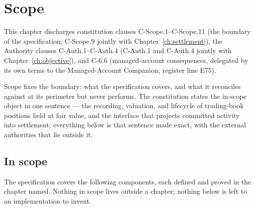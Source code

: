 \section{Scope}\label{ch:scope}

This chapter discharges constitution clauses C-Scope.1--C-Scope.11 (the boundary of the specification; C-Scope.9 jointly with Chapter~\ref{ch:settlement}), the Authority clauses C-Auth.1--C-Auth.4 (C-Auth.1 and C-Auth.4 jointly with Chapter~\ref{ch:objective}), and C-6.6 (managed-account consequences, delegated by its own terms to the Managed-Account Companion, register line E75).

Scope fixes the boundary: what the specification covers, and what it reconciles against
at its perimeter but never performs. The constitution states the in-scope object in one
sentence --- the recording, valuation, and lifecycle of trading-book positions held at
fair value, and the interface that projects committed activity into settlement; everything
below is that sentence made exact, with the external authorities that lie outside it.

\subsection{In scope}

The specification covers the following components, each defined and proved in the chapter
named. Nothing in scope lives outside a chapter; nothing below is left to an implementation
to invent.

